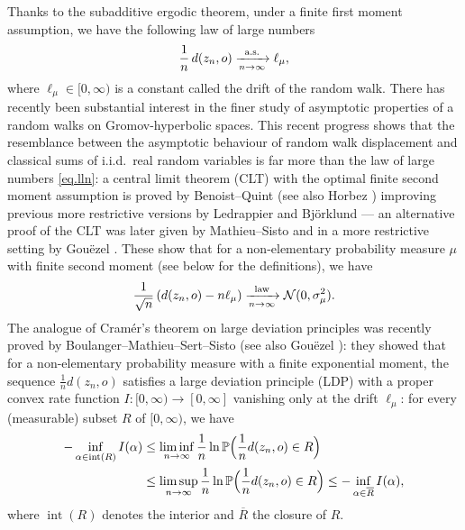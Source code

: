 \documentclass[10pt]{amsart}
\theoremstyle{plain}
\theoremstyle{definition}
\DeclareMathOperator\inte{int}
\begin{document}
Thanks to the subadditive ergodic theorem, under a finite first moment assumption, we have the following law of large numbers
\begin{equation}\label{eq.lln}
\frac{1}{n}\, d(z_n,o) \xrightarrow[n \to \infty]{\textup{a.s.}} \ell_\mu,
\end{equation}
where $\ell_\mu \in [0,\infty)$ is a constant called the drift of the random walk. There has recently been substantial interest in the finer study of asymptotic properties of a random walks on Gromov-hyperbolic spaces. This recent progress shows that the resemblance between the asymptotic behaviour of random walk displacement and classical sums of i.i.d.~real random variables is far more than the law of large numbers \eqref{eq.lln}: a central limit theorem (CLT) with the optimal finite second moment assumption is proved by Benoist--Quint \cite{BQ.hyperbolic} (see also Horbez \cite{horbez}) improving previous more restrictive versions by Ledrappier \cite{ledrappier.lecturenotes} and Björklund \cite{bjorklund} --- an alternative proof of the CLT was later given by Mathieu--Sisto \cite{mathieu-sisto} and in a more restrictive setting by Gouëzel \cite{gouezel.gap}. These show that for a non-elementary probability measure $\mu$ with finite second moment (see below for the definitions), we have
\begin{equation}\label{eq.clt}
\frac{1}{\sqrt{n}}\,(d(z_n,o) - n \ell_\mu) \xrightarrow[n \to \infty]{\textup{law}} \mathcal{N}(0,\sigma_{\mu}^2).
\end{equation}
The analogue of Cramér's theorem on large deviation principles was recently proved by Boulanger--Mathieu--Sert--Sisto \cite{BMSS} (see also Gouëzel \cite{gouezel.first.moment}): they showed that for a non-elementary probability measure with a finite exponential moment, the sequence $\frac{1}{n}d(z_n,o)$ satisfies a large deviation principle (LDP) with a proper convex rate function $I:[0,\infty) \to [0,\infty]$ vanishing only at the drift $\ell_\mu$: for every (measurable) subset $R$ of $[0,\infty)$, we have
\begin{equation}\label{eq.ldp}
\begin{split}
-\inf_{\alpha \in \inte(R)} I(\alpha) &\leq \liminf_{n \to \infty} \frac{1}{n}\ln \mathbb{P}\Bigl(\frac{1}{n}d(z_n,o) \in R\Bigr)\\
&\leq \limsup_{n \to \infty} \frac{1}{n}\ln \mathbb{P}\Bigl(\frac{1}{n}d(z_n,o) \in R\Bigr) \leq -\inf_{\alpha \in \overline{R}} I(\alpha),
\end{split}
\end{equation}
where $\inte(R)$ denotes the interior and $\overline{R}$ the closure of $R$.
\end{document}
